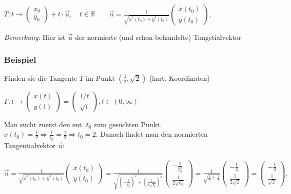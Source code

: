 \documentclass[11pt]{article} %
\begin{document}
\begin{center}

$T: t \rightarrow  \left(\!
    \begin{array}{c}
     x_0  \\
     y_0
    \end{array}
  \!\right) + t\cdot \vec u, \quad t\in \mathbb{R}\qquad \vec u = \frac{1}{\sqrt{\dot x^2(t_0)+\dot y^2(t_0)}}  \left(\!
    \begin{array}{c}
     \dot x(t_0)  \\
     \dot y(t_0)
    \end{array}
  \!\right), $ 

\end{center}

\emph{Bemerkung:} Hier ist $\vec u$ der normierte (und schon behandelte) Tangetialvektor

\subsubsection{Beispiel}

Finden sie die Tangente $T$ im Punkt $(\frac{1}{2},\sqrt{2})$ (kart. Koordinaten)

$\Gamma: t \rightarrow  \left(\!
    \begin{array}{c}
     x(t)   \\
     y(t) 
    \end{array}
  \!\right) = \left(\!
    \begin{array}{c}
     1/t   \\
     \sqrt{t} 
    \end{array}
  \!\right), t \in (0, \infty)$

Man sucht zuerst den ent. $t_0$ zum gesuchten Punkt. $x(t_0) = \frac{1}{2} \Rightarrow \frac{1}{t_0} = \frac{1}{2} \Rightarrow t_0 = 2$. Danach findet man den normierten Tangentialvektor $\vec u$:\\\\

$\vec u = \frac{1}{\sqrt{\dot x^2(t_0)+\dot y^2(t_0)}}  \left(\!
    \begin{array}{c}
     \dot x(t_0)  \\
     \dot y(t_0)
    \end{array}
  \!\right)  = \frac{1}{\sqrt{ (-\frac{1}{t_0^2})^2+ (\frac{1}{2\sqrt{t_0}})^2 }}  \left(\!
    \begin{array}{c}
      -\frac{1}{t_0^2}  \\
      \frac{1}{2\sqrt{t_0}}
    \end{array}
  \!\right) = \frac{1}{\sqrt{ \frac{1}{8}+ \frac{1}{8}}}  \left(\!
    \begin{array}{c}
      -\frac{1}{4}  \\
      \frac{1}{2\sqrt{2}}
    \end{array}
  \!\right) =  \left(\!
    \begin{array}{c}
      -\frac{1}{2}  \\
      \frac{1}{\sqrt{2}}
    \end{array}
  \!\right), $
\end{document}
